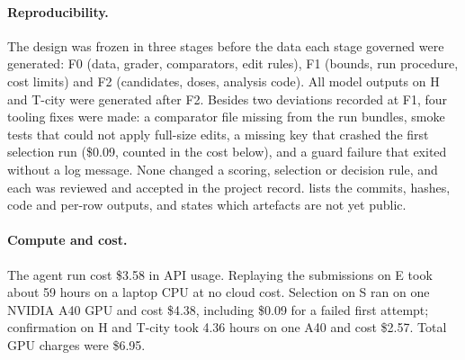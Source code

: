 \paragraph{Reproducibility.}
The design was frozen in three stages before the data each stage governed were generated: F0 (data, grader,
comparators, edit rules), F1 (bounds, run procedure, cost limits) and F2 (candidates, doses, analysis code). All
model outputs on H and T-city were generated after F2. Besides two deviations recorded at F1, four tooling fixes
were made: a comparator file missing from the run bundles, smoke tests that could not apply full-size edits, a
missing key that crashed the first selection run (\$0.09, counted in the cost below), and a guard failure that
exited without a log message. None changed a scoring, selection or decision rule, and each was reviewed and accepted
in the project record.  lists the commits, hashes, code and per-row outputs, and states which
artefacts are not yet public.

\paragraph{Compute and cost.}
The agent run cost \$3.58 in API usage. Replaying the submissions on E took about 59 hours on a laptop CPU at no
cloud cost. Selection on S ran on one NVIDIA A40 GPU and cost \$4.38, including \$0.09 for a failed first attempt;
confirmation on H and T-city took 4.36 hours on one A40 and cost \$2.57. Total GPU charges were \$6.95.
